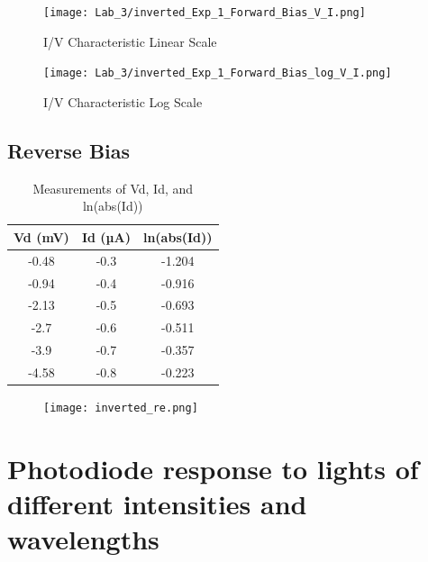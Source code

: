 \documentclass[a4paper]{article}
\begin{document}
\begin{figure}[h!]
    \centering
    \texttt{[image: Lab\_3/inverted\_Exp\_1\_Forward\_Bias\_V\_I.png]}
    \caption{I/V Characteristic Linear Scale}
\end{figure}

\newpage

\begin{figure}[h!]
    \centering
    \texttt{[image: Lab\_3/inverted\_Exp\_1\_Forward\_Bias\_log\_V\_I.png]}
    \caption{I/V Characteristic Log Scale}
\end{figure}

\subsection{Reverse Bias}
\begin{table}[h!]
\centering
\begin{tabular}{|c|c|c|}
\hline
\textbf{Vd (mV)} & \textbf{Id (µA)} & \textbf{ln(abs(Id))} \\ \hline
-0.48 & -0.3 & -1.204 \\ \hline
-0.94 & -0.4 & -0.916 \\ \hline
-2.13 & -0.5 & -0.693 \\ \hline
-2.7 & -0.6 & -0.511 \\ \hline
-3.9 & -0.7 & -0.357 \\ \hline
-4.58 & -0.8 & -0.223 \\ \hline
\end{tabular}
\caption{Measurements of Vd, Id, and ln(abs(Id))}
\label{tab:voltage_current_log}
\end{table}


\begin{figure}[h!]
    \centering
    \texttt{[image: inverted\_re.png]}
\end{figure}

\newpage
























\newpage

\section{Photodiode response to lights of different intensities and wavelengths}
\end{document}
